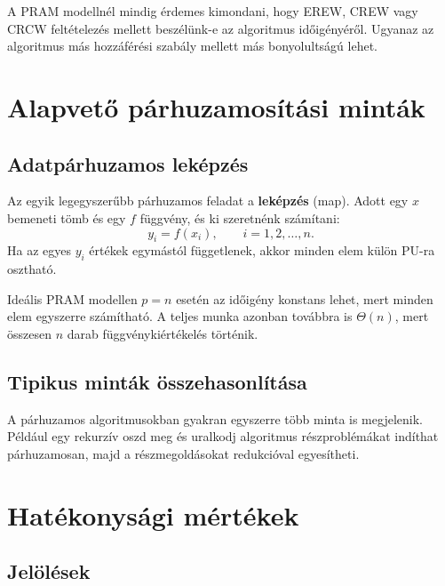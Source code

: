 \begin{summarybox}
A PRAM modellnél mindig érdemes kimondani, hogy EREW, CREW vagy CRCW feltételezés mellett beszélünk-e az algoritmus időigényéről. Ugyanaz az algoritmus más hozzáférési szabály mellett más bonyolultságú lehet.
\end{summarybox}

\section{Alapvető párhuzamosítási minták}

\subsection{Adatpárhuzamos leképzés}

Az egyik legegyszerűbb párhuzamos feladat a \textbf{leképzés} (map). Adott egy $x$ bemeneti tömb és egy $f$ függvény, és ki szeretnénk számítani:
\[
  y_i=f(x_i),\qquad i=1,2,\dots,n.
\]
Ha az egyes $y_i$ értékek egymástól függetlenek, akkor minden elem külön PU-ra osztható.


Ideális PRAM modellen $p=n$ esetén az időigény konstans lehet, mert minden elem egyszerre számítható. A teljes munka azonban továbbra is $\Theta(n)$, mert összesen $n$ darab függvénykiértékelés történik.

\subsection{Tipikus minták összehasonlítása}

\begin{center}

\end{center}

A párhuzamos algoritmusokban gyakran egyszerre több minta is megjelenik. Például egy rekurzív oszd meg és uralkodj algoritmus részproblémákat indíthat párhuzamosan, majd a részmegoldásokat redukcióval egyesítheti.

\section{Hatékonysági mértékek}

\subsection{Jelölések}

